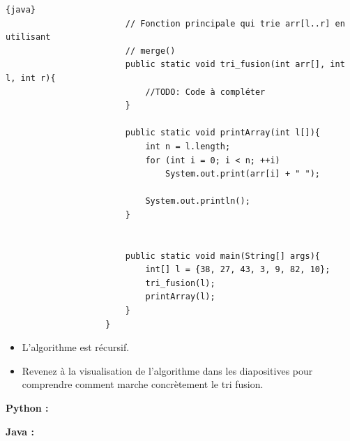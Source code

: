 \begin{Exercice} [30 minutes]
\begin{itemize}
\begin{lstlisting}{java}
                        // Fonction principale qui trie arr[l..r] en utilisant 
                        // merge() 
                        public static void tri_fusion(int arr[], int l, int r){
                            //TODO: Code à compléter 
                        }
                        
                        public static void printArray(int l[]){ 
                            int n = l.length; 
                            for (int i = 0; i < n; ++i) 
                                System.out.print(arr[i] + " "); 
                      
                            System.out.println(); 
                        } 
              
                        
                        public static void main(String[] args){
                            int[] l = {38, 27, 43, 3, 9, 82, 10};
                            tri_fusion(l);
                            printArray(l);
                        }
                    }
                \end{lstlisting}
    \end{itemize}
    
    \begin{conseil}
    \begin{itemize}
        \item L'algorithme est récursif. 
        \item Revenez à la visualisation de l'algorithme dans les diapositives pour comprendre comment marche concrètement le tri fusion. 
    \end{itemize}
    
    \end{conseil}
    
    \begin{solution}
        \textbf{Python :}
         
    \end{solution}
    \begin{solution}
        \textbf{Java :}
        
    \end{solution}
    \begin{solution}
        
        

\end{solution}
\end{Exercice}
